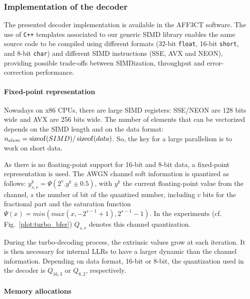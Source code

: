 \subsubsection{Implementation of the decoder}
\label{sec:turbo_implem}

The presented decoder implementation is available in the AFF3CT software. The
use of \texttt{C++} templates associated to our generic SIMD library enables the
same source code to be compiled using different formats (32-bit \texttt{float},
16-bit \texttt{short}, and 8-bit \texttt{char}) and different SIMD instructions
(SSE, AVX and NEON), providing possible trade-offs between SIMDization,
throughput and error-correction performance.

\paragraph{Fixed-point representation}

Nowadays on x86 CPUs, there are large SIMD registers: SSE/NEON are 128 bits
wide and AVX are 256 bits wide. The number of elements that can be vectorized
depends on the SIMD length and on the data format:
$n_{elem} = \operatorname*{sizeof}(SIMD) / \operatorname*{sizeof}(data)$. So, the key for a large parallelism
is to work on short data.

As there is no floating-point support for 16-bit and 8-bit data, a fixed-point
representation is used. The AWGN channel soft information is quantized as
follows: $y_{s,v}^k = \Psi(2^v . y^k \pm 0.5)$, with $y^k$ the current
floating-point value from the channel, $s$ the number of bit of the quantized
number, including $v$ bits for the fractional part and the saturation function
$\Psi(x) = min(max(x, -2^{s-1} +1), 2^{s-1} -1)$. In the experiments
(cf. Fig.~\ref{plot:turbo_bfer}) $Q_{s,v}$ denotes this channel quantization.

During the turbo-decoding process, the extrinsic values grow at each iteration.
It is then necessary for internal LLRs to have a larger dynamic than the channel
information. Depending on data format, 16-bit or 8-bit, the quantization used in
the decoder is $Q_{16,3}$ or $Q_{8,2}$, respectively.

\paragraph{Memory allocations}

